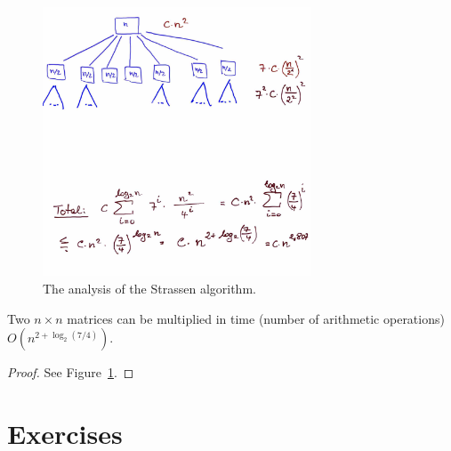   \begin{figure}
    \centering
     \includegraphics[height=8cm]{figures/Strassen2.pdf} 
    \caption{The analysis of the Strassen algorithm. }
    \label{fig:str:1}
  \end{figure}


  \begin{theorem}[Strassen]
    \label{thr:10}
    Two $n × n$ matrices can be multiplied in time (number of arithmetic operations) $O(n^{2+ \log_2(7/4)})$. 
  \end{theorem}



  \begin{proof}
    See Figure~\ref{fig:str:1}. 

  \end{proof}

\section*{Exercises}

